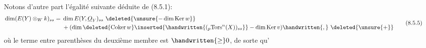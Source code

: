 Notons d'autre part l'égalité suivante déduite de (8.5.1):
\[
\begin{aligned}
\dim(E(Y)\otimes_W k)_{ss}={}&\dim E(Y,\underline O_Y)_{ss}\ \deleted{\unsure{-\dim\mathrm{Ker}\,w}}\\
&+(\dim\deleted{\mathrm{Coker}\,w}\inserted{\handwritten{({}_p\mathrm{Tors}^n(X))_{ss}}}-\dim\mathrm{Ker}\,v)\handwritten{,}\ \deleted{\unsure{+}}
\end{aligned}
\tag*{(8.5.5)}
\]
où le terme entre parenthèses du deuxième membre est $\handwritten{\geq}0$, de sorte qu'
